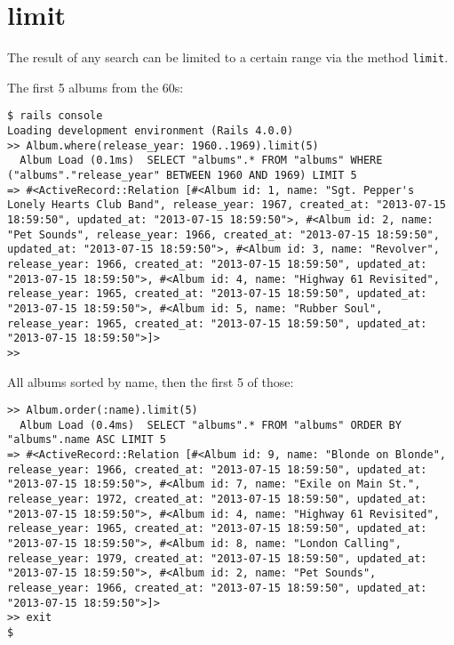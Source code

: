 \documentclass[a4paper]{book}
\begin{document}
\section{limit}\label{limit}

The result of any search can be limited to a certain range via the method \texttt{limit}.

The first 5 albums from the 60s:

\begin{shaded}\begin{verbatim}
$ rails console
Loading development environment (Rails 4.0.0)
>> Album.where(release_year: 1960..1969).limit(5)
  Album Load (0.1ms)  SELECT "albums".* FROM "albums" WHERE ("albums"."release_year" BETWEEN 1960 AND 1969) LIMIT 5
=> #<ActiveRecord::Relation [#<Album id: 1, name: "Sgt. Pepper's Lonely Hearts Club Band", release_year: 1967, created_at: "2013-07-15 18:59:50", updated_at: "2013-07-15 18:59:50">, #<Album id: 2, name: "Pet Sounds", release_year: 1966, created_at: "2013-07-15 18:59:50", updated_at: "2013-07-15 18:59:50">, #<Album id: 3, name: "Revolver", release_year: 1966, created_at: "2013-07-15 18:59:50", updated_at: "2013-07-15 18:59:50">, #<Album id: 4, name: "Highway 61 Revisited", release_year: 1965, created_at: "2013-07-15 18:59:50", updated_at: "2013-07-15 18:59:50">, #<Album id: 5, name: "Rubber Soul", release_year: 1965, created_at: "2013-07-15 18:59:50", updated_at: "2013-07-15 18:59:50">]>
>>
\end{verbatim}\end{shaded}

All albums sorted by name, then the first 5 of those:

\begin{shaded}\begin{verbatim}
>> Album.order(:name).limit(5)
  Album Load (0.4ms)  SELECT "albums".* FROM "albums" ORDER BY "albums".name ASC LIMIT 5
=> #<ActiveRecord::Relation [#<Album id: 9, name: "Blonde on Blonde", release_year: 1966, created_at: "2013-07-15 18:59:50", updated_at: "2013-07-15 18:59:50">, #<Album id: 7, name: "Exile on Main St.", release_year: 1972, created_at: "2013-07-15 18:59:50", updated_at: "2013-07-15 18:59:50">, #<Album id: 4, name: "Highway 61 Revisited", release_year: 1965, created_at: "2013-07-15 18:59:50", updated_at: "2013-07-15 18:59:50">, #<Album id: 8, name: "London Calling", release_year: 1979, created_at: "2013-07-15 18:59:50", updated_at: "2013-07-15 18:59:50">, #<Album id: 2, name: "Pet Sounds", release_year: 1966, created_at: "2013-07-15 18:59:50", updated_at: "2013-07-15 18:59:50">]>
>> exit
$
\end{verbatim}\end{shaded}
\end{document}
